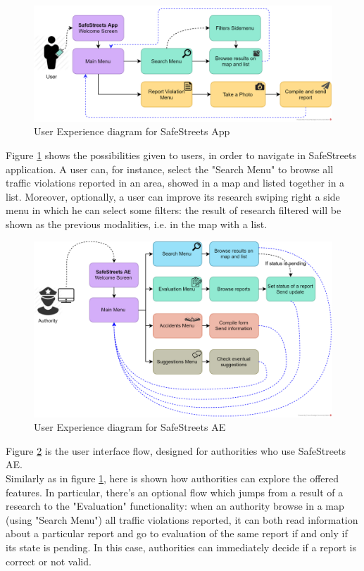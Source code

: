 \documentclass{article}
\begin{document}
		\begin{figure}[H]
			\centering
			\includegraphics[width=1\textwidth]{diagrams/UXSafeStreetsApp.png}
			\caption[User Experience diagram for SafeStreets App]{User Experience diagram for SafeStreets App}
			\label{fig:UX_SSApp}
		\end{figure}
	
		Figure \ref{fig:UX_SSApp} shows the possibilities given to users, in order to navigate in SafeStreets application. A user can, for instance, select the "Search Menu" to browse all traffic violations reported in an area, showed in a map and listed together in a list.
		Moreover, optionally, a user can improve its research swiping right a side menu in which he can select some filters: the result of research filtered will be shown as the previous modalities, i.e. in the map with a list.
	
		\begin{figure}[H]
			\centering
			\includegraphics[width=1\textwidth]{diagrams/UXSafeStreetsAE.png}
			\caption[User Experience diagram for SafeStreets AE]{User Experience diagram for SafeStreets AE}
			\label{fig:UX_SSAE}
		\end{figure}
	
		Figure \ref{fig:UX_SSAE} is the user interface flow, designed for authorities who use SafeStreets AE.\\
		Similarly as in figure \ref{fig:UX_SSApp}, here is shown how authorities can explore the offered features. In particular, there's an optional flow which jumps from a result of a research to the "Evaluation" functionality: when an authority browse in a map (using "Search Menu") all traffic violations reported, it can both read information about a particular report and go to evaluation of the same report if and only if its state is pending. In this case, authorities can immediately decide if a report is correct or not valid.
		
\end{document}
